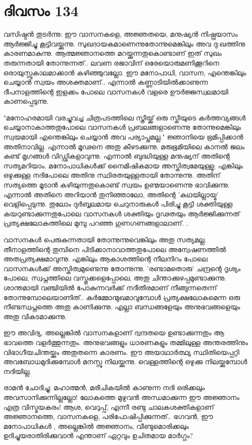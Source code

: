\newpage
\section{ദിവസം 134}


വസിഷ്ഠന്‍ തുടര്‍ന്നു: ഈ വാസനകളെ, അജ്ഞതയെ, മനുഷ്യന്‍ നിഷ്പ്രയാസം ആര്‍ജ്ജിച്ചു കൂട്ടിവയ്ക്കുന്നു. സുഖദായകമാണെന്നുതോന്നുമെങ്കിലും അവ ദു:ഖത്തിനു കാരണമാകുന്നു. ആത്മജ്ഞാനത്തെ മറയ്ക്കുന്നതുകൊണ്ടാണ്‌ ഇത്‌ സുഖം തരുന്നതായി തോന്നുന്നത്‌..  ലവണ രജാവിന്‌ ഒരേയൊരുമണിക്കൂറിനെ ഒരായുസ്സുകാലമാക്കാന്‍ കഴിഞ്ഞുവല്ലോ. ഈ മനോപാധി, വാസന, എന്തെങ്കിലും ചെയ്യാന്‍ സ്വയം അശക്തമാണ്‌.. എന്നാല്‍ കണ്ണാടിയില്‍ക്കാണുന്ന ദീപനാളത്തിന്റെ ഇളക്കം പോലെ വാസനകള്‍ വളരെ ഊര്‍ജ്ജസ്വലമായി കാണപ്പെടുന്നു.

"മനോഹരമായി വരച്ചുവച്ച ചിത്രപടത്തിലെ സ്ത്രീയ്ക്ക്‌ ഒരു സ്തീയുടെ കര്‍ത്തവ്യങ്ങള്‍ ചെയ്യാനാകാത്തതുപോലെ വാസനകള്‍ പ്രബലങ്ങളാണെന്നു തോന്നുമെങ്കിലും സ്വയമായി എന്തെങ്കിലും ചെയ്യാന്‍ അവ പര്യാപ്തമല്ല." ജ്ഞാനിയെ ഭ്രമിപ്പിക്കാന്‍ അതിനാവില്ല. എന്നാല്‍ മൂഢനെ അതു കീഴടക്കുന്നു. മരുഭൂമിയിലെ കാനല്‍ ജലം കണ്ട്‌ മൃഗങ്ങള്‍ വിഡ്ഢികളാവുന്നു. എന്നാല്‍  ബുദ്ധിയുള്ള മനുഷ്യന്‌ അതിന്റെ സത്യമറിയാം. മനോപാധികള്‍ക്ക്‌ നൈമിഷികമായ അസ്തിത്വമേയുള്ളു; എങ്കിലും ഒഴുക്കുള്ള നദിപോലെ അതിനു സ്ഥിരതയുള്ളതായി തോന്നുന്നു. അതിന്‌ സത്യത്തെ മൂടാന്‍ കഴിയുന്നതുകൊണ്ട്‌ സ്വയം ഉണ്മയാണെന്നു ഭാവിക്കുന്നു. എന്നാല്‍ അതിനെ അറിയാന്‍ തുനിഞ്ഞാലോ, അതിന്റെ 'കഥയില്ലായ്മ' വെളിപ്പെടുന്നു. തുലോം ദുര്‍ബ്ബലമായ ചെറുനാരുകള്‍ പിരിച്ചു കൂട്ടി ശക്തിയുള്ള കയറുണ്ടാക്കുന്നതുപോലെ വാസനകള്‍ ശക്തിയും ദൃഢതയും ആര്‍ജ്ജിക്കുന്നത്‌ പ്രത്യക്ഷലോകത്തിലെ മുമ്പു പറഞ്ഞ ഗുണഗണങ്ങളാലാണ്‌. . 

വാസനകള്‍ പെരുകുന്നതായി തോന്നുന്നുവെങ്കിലും അതു സത്യമല്ല. തീനാളത്തിന്റെ തുമ്പിനെ പിടിക്കാനാവാത്തതുപോലെ അന്വേഷണത്തില്‍ അതപ്രത്യക്ഷമാവുന്നു. എങ്കിലും ആകാശത്തിന്റെ നീലനിറം പോലെ വാസനകള്‍ക്ക്‌ അസ്തിത്വമുണ്ടെന്നു തോന്നുന്നു. 'രണ്ടാമതൊരു' ചന്ദ്രന്റെ ദൃശ്യം പോലെ, സ്വപ്നത്തിലെ വസ്തുക്കളെപ്പോലെ, അതു ചിന്താക്കുഴപ്പമുണ്ടാക്കുന്നു. ശാന്തമായി വഞ്ചിയില്‍ പോകുന്നവര്‍ക്ക്‌ നദീതീരമാണ്‌ നീങ്ങുന്നതെന്ന് തോന്നുമ്പോലെയാണിത്‌..  കര്‍മ്മോന്മുഖമാവുമ്പോള്‍ പ്രത്യക്ഷലോകമെന്ന ഒരു നീണ്ടസ്വപ്നത്തെ അതു കാണിക്കുന്നു. എല്ലാ ബന്ധങ്ങളേയും അനുഭവങ്ങളെയും അതു വികടമാക്കുന്നു.

ഈ അവിദ്യ, അല്ലെങ്കില്‍ വാസനകളാണ്‌ ദ്വന്ദതയെ ഉണ്ടാക്കുന്നതും ആ ഭാവത്തെ വളര്‍ത്തുന്നതും. അനുഭവങ്ങളും ധാരണകളും തമ്മിലുള്ള അന്തരത്തിനും വിഭാഗീയചിന്തയ്ക്കും അതുതന്നെ കാരണം. ഈ അയാഥാര്‍ത്ഥ്യ സ്ഥിതിയെപ്പറ്റി അവബോധമുദിക്കുമ്പോള്‍ മനസ്സു നിലയ്ക്കുന്നു. വെള്ളത്തിന്റെ ഒഴുക്കു നിലയ്ക്കുമ്പോള്‍ നദിയില്ല.

രാമന്‍ ചോദിച്ചു: മഹാത്മന്‍, മരീചികയില്‍ കാണുന്ന നദി ഒരിക്കലും അവസാനിക്കുന്നില്ലല്ലോ! ലോകത്തെ മുഴുവന്‍ അന്ധമാക്കുന്ന ഈ അജ്ഞാനം എത്ര വിസ്മയകരം! ആശ, വെറുപ്പ്‌, എന്നീ രണ്ടു ചാലകശക്തികളാണ്‌ അജ്ഞാനത്തെ, വാസനകളെ, പരിപോഷിപ്പിക്കുന്നത്‌..  ഭഗവന്‍,   ഈ മനോപാധികള്‍ , അല്ലെങ്കില്‍ അജ്ഞാനം, വീണ്ടുമൊരിക്കലും ഉദിച്ചുയരാതിരിക്കുവാന്‍ എന്താണ്‌ ഏറ്റവും ഉചിതമായ മാര്‍ഗ്ഗം?

